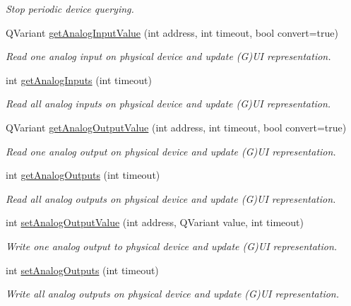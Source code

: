 \begin{DoxyCompactItemize}
\begin{DoxyCompactList}\small\item\em Stop periodic device querying. \end{DoxyCompactList}\item 
QVariant \hyperlink{classmdt_device_a4f44e5dcef34b7e9f0342096913ea793}{getAnalogInputValue} (int address, int timeout, bool convert=true)
\begin{DoxyCompactList}\small\item\em Read one analog input on physical device and update (G)UI representation. \end{DoxyCompactList}\item 
int \hyperlink{classmdt_device_a585cc32f6aac4d5788928ecf1fdacf51}{getAnalogInputs} (int timeout)
\begin{DoxyCompactList}\small\item\em Read all analog inputs on physical device and update (G)UI representation. \end{DoxyCompactList}\item 
QVariant \hyperlink{classmdt_device_a4ec0255675f27a48f35edcfd0ba7d129}{getAnalogOutputValue} (int address, int timeout, bool convert=true)
\begin{DoxyCompactList}\small\item\em Read one analog output on physical device and update (G)UI representation. \end{DoxyCompactList}\item 
int \hyperlink{classmdt_device_a12f717202e9860d0c24b9dff8d672ef8}{getAnalogOutputs} (int timeout)
\begin{DoxyCompactList}\small\item\em Read all analog outputs on physical device and update (G)UI representation. \end{DoxyCompactList}\item 
int \hyperlink{classmdt_device_a4b01925cfbbb62e32a3e85a9c4b1538a}{setAnalogOutputValue} (int address, QVariant value, int timeout)
\begin{DoxyCompactList}\small\item\em Write one analog output to physical device and update (G)UI representation. \end{DoxyCompactList}\item 
int \hyperlink{classmdt_device_ae45c39c2ef38b5952171fdc1c3284748}{setAnalogOutputs} (int timeout)
\begin{DoxyCompactList}\small\item\em Write all analog outputs on physical device and update (G)UI representation. \end{DoxyCompactList}\item 

\end{DoxyCompactItemize}
